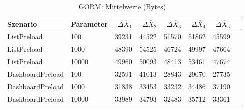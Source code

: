 
\begin{table}[ht]
\setlength{\extrarowheight}{-1pt}
\centering
\caption{GORM: Mittelwerte (Bytes)}
\begin{tabular}{llrrrrrr}
\toprule
Szenario & Parameter & ${\Delta \overline{X}_1}$ & ${\Delta \overline{X}_2}$ & ${\Delta \overline{X}_3}$ & ${\Delta \overline{X}_4}$ & ${\Delta \overline{X}_5}$ \\
\midrule
	ListPreload & 100 & 39231 & 44522 & 51570 & 51862 & 45599 \\
	ListPreload & 1000 & 48390 & 54525 & 46724 & 49997 & 47664 \\
	ListPreload & 10000 & 49960 & 50093 & 48413 & 53461 & 47674 \\
	DashboardPreload & 100 & 32591 & 41013 & 28843 & 29070 & 27735 \\
	DashboardPreload & 1000 & 31838 & 33453 & 33232 & 34486 & 37190 \\
	DashboardPreload & 10000 & 33989 & 34793 & 32483 & 35712 & 33361 \\
\bottomrule
\end{tabular}
\label{tab:mittelwerte_gorm_bytes}
\end{table}
	